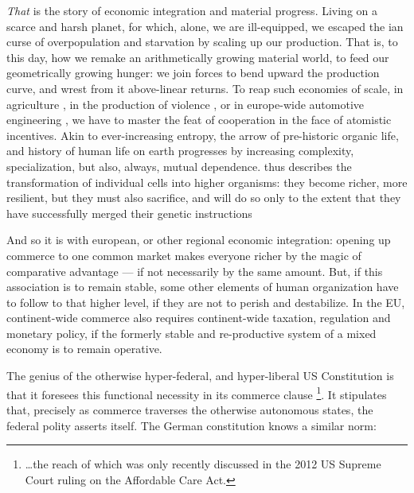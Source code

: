 \documentclass[11pt,a4paper,oneside]{article}
\begin{document}
\emph{That} is the story of economic integration and material progress.
Living on a scarce and harsh planet, for which, alone, we are ill-equipped, we escaped the \citeauthor{Malthus1798}ian curse of overpopulation and starvation by scaling up our production.
That is, to this day, how we remake an arithmetically growing material world, to feed our geometrically growing hunger:
we join forces to bend upward the production curve, and wrest from it above-linear returns.
To reap such economies of scale, in agriculture \citep{Diamond1997}, in the production of violence \citep{Tilly-1985-aa}, or in europe-wide automotive engineering \citep{Krugman-1980-aa}, we have to master the feat of cooperation in the face of atomistic incentives.
Akin to ever-increasing entropy, the arrow of pre-historic organic life, and history of human life on earth progresses by increasing complexity, specialization, but also, always, mutual dependence.
\citeauthor{Wright1994} thus describes the transformation of individual cells into higher organisms:
they become richer, more resilient, but they must also sacrifice, and will do so only to the extent that they have successfully merged their genetic instructions \citeyearpar[Chapter 7, 8]{Wright1994}

And so it is with european, or other regional economic integration:
opening up commerce to one common market makes everyone richer by the magic of comparative advantage --- if not necessarily by the same amount.
But, if this association is to remain stable, some other elements of human organization have to follow to that higher level, if they are not to perish and destabilize.
In the \gls{EU}, continent-wide commerce also requires continent-wide taxation, regulation and monetary policy, if the formerly stable and re-productive system of a mixed economy is to remain operative.

The genius of the otherwise hyper-federal, and hyper-liberal US Constitution is that it foresees this functional necessity in its commerce clause
\footnote{
	\ldots the reach of which was only recently discussed in the 2012 US Supreme Court ruling on the Affordable Care Act.
}.
It stipulates that, precisely as commerce traverses the otherwise autonomous states, the federal polity asserts itself.
The German constitution knows a similar norm:
\end{document}

